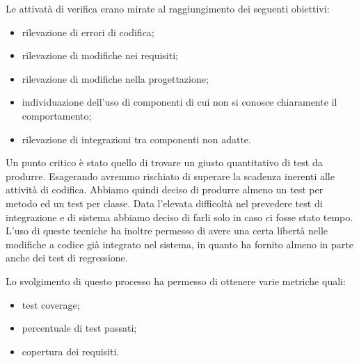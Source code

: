 Le attivatà di verifica erano mirate al raggiungimento dei seguenti obiettivi: 
\begin{itemize}
    \item rilevazione di errori di codifica;
    \item rilevazione di modifiche nei requisiti;
    \item rilevazione di modifiche nella progettazione;
    \item individuazione dell’uso di componenti di cui non si conosce chiaramente il comportamento;
    \item rilevazione di integrazioni tra componenti non adatte.
\end{itemize}
Un punto critico è stato quello di trovare un giusto quantitativo di test da produrre. Esagerando avremmo rischiato di superare la scadenza inerenti alle attività di codifica.
Abbiamo quindi deciso di produrre almeno un test per metodo ed un test per classe. 
Data l’elevata difficoltà nel prevedere test di integrazione e di sistema abbiamo deciso di farli solo in caso ci fosse stato tempo. 
L'uso di queste tecniche ha inoltre permesso di avere una certa libertà nelle modifiche a codice già integrato nel sistema, in quanto ha fornito almeno in parte anche dei test di regressione. 

Lo svolgimento di questo processo ha permesso di ottenere varie metriche quali:
\begin{itemize}
    \item test coverage;
    \item percentuale di test passati;
    \item copertura dei requisiti.
\end{itemize}

